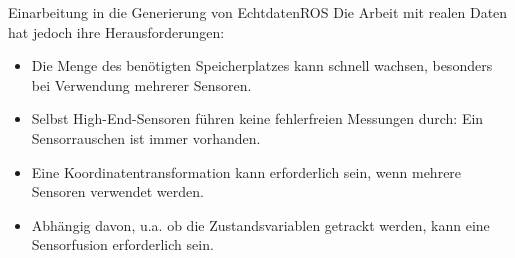 \documentclass[169, handout	]{THIbeamer} %
\begin{document}
	\begin{frame}{Einarbeitung in die Generierung von Echtdaten}{ROS}
		Die Arbeit mit realen Daten hat jedoch ihre Herausforderungen:
		\begin{itemize}
			\item Die Menge des benötigten Speicherplatzes kann schnell wachsen, besonders bei Verwendung mehrerer Sensoren.
			\item Selbst High-End-Sensoren führen keine fehlerfreien Messungen durch: Ein Sensorrauschen ist immer vorhanden.
			\item Eine Koordinatentransformation kann erforderlich sein, wenn mehrere Sensoren verwendet werden.
			\item Abhängig davon, u.a. ob die Zustandsvariablen getrackt werden, kann eine Sensorfusion erforderlich sein.
		\end{itemize}
	\end{frame}
\end{document}
